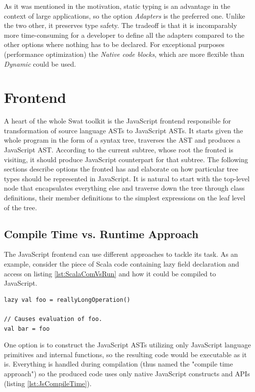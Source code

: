 \documentclass[12pt,a4paper]{report}
\begin{document}
As it was mentioned in the motivation, static typing is an advantage in the context of large applications, so the option {\it Adapters} is the preferred one. Unlike the two other, it preserves type safety. The tradeoff is that it is incomparably more time-consuming for a developer to define all the adapters compared to the other options where nothing has to be declared. For exceptional purposes (performance optimization) the {\it Native code blocks}, which are more flexible than {\it Dynamic} could be used.

\section{Frontend}

A heart of the whole Swat toolkit is the JavaScript frontend responsible for transformation of source language ASTs to JavaScript ASTs. It starts given the whole program in the form of a syntax tree, traverses the AST and produces a JavaScript AST. According to the current subtree, whose root the fronted is visiting, it should produce JavaScript counterpart for that subtree. The following sections describe options the fronted has and elaborate on how particular tree types should be represented in JavaScript. It is natural to start with the top-level node that encapsulates everything else and traverse down the tree through class definitions, their member definitions to the simplest expressions on the leaf level of the tree.

\subsection{Compile Time vs. Runtime Approach}

The JavaScript frontend can use different approaches to tackle its task. As an example, consider the piece of Scala code containing lazy field declaration and access on listing \ref{lst:ScalaComVsRun} and how it could be compiled to JavaScript.

\begin{lstlisting}[caption={Lazy field declaration and access.},label={lst:ScalaComVsRun}]
lazy val foo = reallyLongOperation()

// Causes evaluation of foo.
val bar = foo 
\end{lstlisting}

One option is to construct the JavaScript ASTs utilizing only JavaScript language primitives and internal functions, so the resulting code would be executable as it is. Everything is handled during compilation (thus named the "compile time approach") so the produced code uses only native JavaScript constructs and APIs (listing \ref{lst:JsCompileTime}).
\end{document}

